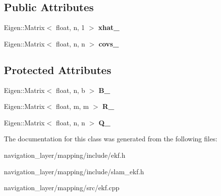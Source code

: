 \subsection*{Public Attributes}
\begin{DoxyCompactItemize}
\item 
\mbox{\label{classmapping_1_1EKF_af953a8e0f00fb0afd7ea402e47748c66}} 
Eigen\+::\+Matrix$<$ float, n, 1 $>$ {\bfseries xhat\+\_\+}
\item 
\mbox{\label{classmapping_1_1EKF_ad782328cf17a9ef5cae9028802603b9f}} 
Eigen\+::\+Matrix$<$ float, n, n $>$ {\bfseries covs\+\_\+}
\end{DoxyCompactItemize}
\subsection*{Protected Attributes}
\begin{DoxyCompactItemize}
\item 
\mbox{\label{classmapping_1_1EKF_a1c2cf3acfc47603a2c89b18079ea958a}} 
Eigen\+::\+Matrix$<$ float, n, b $>$ {\bfseries B\+\_\+}
\item 
\mbox{\label{classmapping_1_1EKF_a5e9f13b5188a461f973518b398d6bd52}} 
Eigen\+::\+Matrix$<$ float, m, m $>$ {\bfseries R\+\_\+}
\item 
\mbox{\label{classmapping_1_1EKF_a276acb331f3fd0c5aeeb2d6b0711d4eb}} 
Eigen\+::\+Matrix$<$ float, n, n $>$ {\bfseries Q\+\_\+}
\end{DoxyCompactItemize}


The documentation for this class was generated from the following files\+:\begin{DoxyCompactItemize}
\item 
navigation\+\_\+layer/mapping/include/ekf.\+h\item 
navigation\+\_\+layer/mapping/include/slam\+\_\+ekf.\+h\item 
navigation\+\_\+layer/mapping/src/ekf.\+cpp\end{DoxyCompactItemize}
